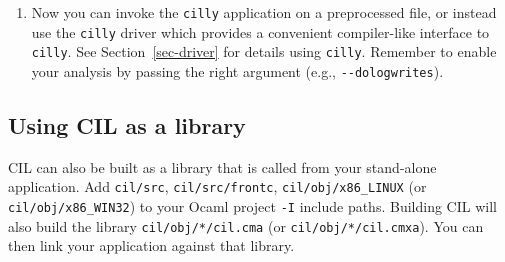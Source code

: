 \documentclass[letterpaper]{article}
\def\secref#1{Section~\ref{sec-#1}}
\def\t#1{{\tt #1}}
\begin{document}
\begin{enumerate}
\begin{enumerate}
 \item If you have any helper files for your module, add those to
 the makefile in the same way.  e.g.:

\begin{verbatim}
CILLY_MODULES = $(CILLY_LIBRARY_MODULES) \
                myutilities1 myutilities2 logwrites \
                main
\end{verbatim}

 Again, order is important: \t{myutilities2.ml} will be able to refer
 to Myutilities1 but not Logwrites.  If you have any ocamllex or ocamlyacc
 files, add them to both \t{CILLY\_MODULES} and either \t{MLLS} or
 \t{MLYS}.

 \item Modify \t{main.ml} so that your new feature descriptor appears in
 the global list of CIL features.
\begin{verbatim}
let features : C.featureDescr list =
  [
    makeCFGFeature;
    Logwrites.feature;  (* add this line to include the logwrites feature! *)
  ]
  @ Feature_config.features
\end{verbatim}

 Features are processed in the order they appear on this list.  Put
 your feature last on the list if you plan to run any of CIL's
 built-in features (such as makeCFGfeature) before your own.

\end{enumerate}

 Standard code in \t{cilly} takes care of adding command-line arguments,
 printing the description, and calling your function automatically.
 Note: do not worry about introducing new bugs into CIL by adding a single
 line to the feature list.

 \item Now you can invoke the \t{cilly} application on a preprocessed file, or
 instead use the \t{cilly} driver which provides a convenient compiler-like
 interface to \t{cilly}. See \secref{driver} for details using \t{cilly}.
 Remember to enable your analysis by passing the right argument (e.g.,
 \t{-{}-{}dologwrites}).

\end{enumerate}

\subsection{Using CIL as a library}

CIL can also be built as a library that is called from your stand-alone
application. Add \t{cil/src}, \t{cil/src/frontc}, \t{cil/obj/x86\_LINUX}
(or \t{cil/obj/x86\_WIN32}) to your Ocaml project \t{-I} include paths.
Building CIL will also build the library \t{cil/obj/*/cil.cma} (or
\t{cil/obj/*/cil.cmxa}). You can then link your application against that
library.
\end{document}
